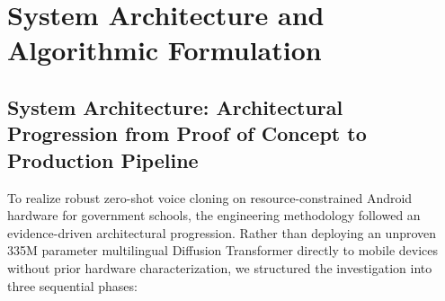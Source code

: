 \chapter{System Architecture and Algorithmic Formulation}
\label{Chapter3}

\section{System Architecture: Architectural Progression from Proof of Concept to Production Pipeline}
To realize robust zero-shot voice cloning on resource-constrained Android hardware for government schools, the engineering methodology followed an evidence-driven architectural progression. Rather than deploying an unproven 335M parameter multilingual Diffusion Transformer directly to mobile devices without prior hardware characterization, we structured the investigation into three sequential phases:

